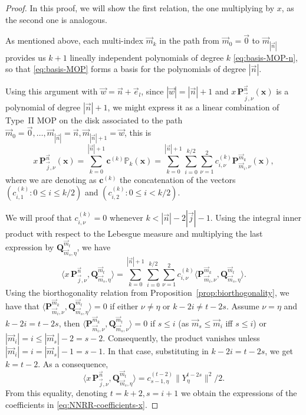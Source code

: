 \documentclass[a4paper]{article}
\theoremstyle{plain}
\theoremstyle{definition}
\begin{document}
    \begin{proof}
        In this proof, we will show the first relation, the one multiplying by $x$, as the second one is analogous.
    
        As mentioned above, each multi-index $\vec m_k$ in the path from $\vec m_0=\vec 0$ to $\vec m_{|\vec n|}$ provides us $k+1$ lineally independent polynomials of degree $k$ \eqref{eq:basis-MOP-n}, so that \eqref{eq:basis-MOP} forms a basis for the polynomials of degree $|\vec n|$.
        
        Using this argument with $\vec w=\vec n + \vec e_l$, since $|\vec w|=|\vec n|+1$ and $x \, \mathbf P_{\vec j,\nu}^{\vec n}(\mathbf x)$ is a polynomial of degree $|\vec n|+1$, we might express it as a linear combination of Type~II MOP on the disk associated to the path $\vec m_0=\vec 0,\dots,\vec m_{|\vec n|}=\vec n, \vec m_{|\vec n|+1}=\vec w$, this is
        $$
        x\, \mathbf P_{\vec j,\nu}^{\vec n}(\mathbf x) =  \sum_{k=0}^{|\vec n|+1}\mathbf c^{(k)} \mathbb P_k(\mathbf x) =  \sum_{k=0}^{|\vec n|+1}\sum_{i=0}^{k/2}\sum_{\nu=1}^2 c_{i,\nu}^{(k)} \mathbf P_{\vec m_i,\nu}^{\vec m_k}(\mathbf x),
        $$
        where we are denoting as $\mathbf c^{(k)}$ the concatenation of the vectors $(c_{i,1}^{(k)}:0\leq i\leq k/2 )$ and $(c_{i,2}^{(k)}:0\leq i< k/2 )$. 
        
        
        We will proof that $c^{(k)}_{i,\nu}=0$ whenever $k<|\vec n|-2|\vec j|-1$. Using the integral inner product with respect to the Lebesgue measure and multiplying the last expression by $\mathbf Q^{\vec m_t}_{\vec m_s,\eta}$, we have
        $$
        \langle x\, \mathbf P_{\vec j,\nu}^{\vec n}, \mathbf Q^{\vec m_t}_{\vec m_s,\eta}\rangle =  \sum_{k=0}^{|\vec n|+1}\sum_{i=0}^{k/2}\sum_{\nu=1}^2 c_{i,\nu}^{(k)} \langle  \mathbf P_{\vec m_i,\nu}^{\vec m_k},\mathbf Q^{\vec m_t}_{\vec m_s,\eta} \rangle.
        $$
        Using the biorthogonality relation from Proposition~\ref{prop:biorthogonality}, we have that $\langle  \mathbf P_{\vec m_i,\nu}^{\vec m_k},\mathbf Q^{\vec m_t}_{\vec m_s,\eta} \rangle=0$ if either $\nu\neq \eta$ or $k-2i \neq t-2 s$. Assume $\nu = \eta$ and $k-2i = t-2 s$, then $\langle \mathbf P_{\vec m_{i},\nu}^{\vec m_k}, \mathbf Q^{\vec m_t}_{\vec m_s,\nu} \rangle=0$ if $s\leq i$ (as $\vec m_s\leq\vec m_i$ iff $s\leq i$) or $|\vec m_i|=i\leq|\vec m_s|-2=s-2$. Consequently, the product vanishes unless $|\vec m_i|=i=|\vec m_s|-1=s-1$. In that case, substituting in $k-2i = t-2 s$, we get $k=t-2$. As a consequence, 
        $$
       \langle x\, \mathbf P_{\vec j,\nu}^{\vec n}, \mathbf Q^{\vec m_t}_{\vec m_s,\eta}\rangle= c^{(t-2)}_{s-1,\eta}\|Y_{\eta}^{t-2s}\|^2/2.
        $$
        From this equality, denoting $t=k+2, s=i+1$ we obtain the expressions of the coefficients in \eqref{eq:NNRR-coefficients-x}.
        

\end{proof}
\end{document}
